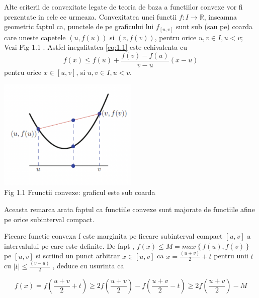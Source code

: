 \documentclass[a4paper,12pt,oneside]{report}
\begin{document}
Alte criterii de convexitate legate de teoria de baza a functiilor convexe vor fi prezentate in cele ce urmeaza. 
Convexitatea unei functii \(f : I\rightarrow \mathbb{R}\), inseamna geometric faptul ca, punctele de pe graficului lui  \(f_{\left [ u,v \right ]}\) sunt sub (sau pe) coarda care uneste capetele \(\left ( u , f {\left ( u \right )} \right )\)  si \(\left ( v , f {\left ( v \right )} \right )\), pentru orice \(u, v \in I, u < v\); 
Vezi Fig 1.1 . Astfel inegalitatea \ref{eq:1.1} este echivalenta cu 
\begin{displaymath}
  f\left ( x \right )\leq f\left ( u \right ) +\frac{f\left ( v \right )- f\left ( u \right )}{v - u}\left ( x - u \right ) \label{eq:1.2} \tag{1.2}
\end{displaymath}
pentru orice \(x\in \left [  u, v\right ]\), si \(u, v \in I, u < v\). 

\begin{center}
	\includegraphics[width=0.5\textwidth]{fig1.1.png}
	\\ Fig 1.1 Frunctii convexe: graficul este sub coarda
\end{center}

Aceasta remarca arata faptul ca functiile convexe sunt majorate de functiile afine pe orice subinterval compact. 

Fiecare functie convexa f este marginita pe fiecare subinterval compact \(\left [ u , v \right ]\) a intervalului pe care este definite. De fapt , \(f\left ( x \right ) \leq  M = max \left \{ f\left ( u \right ), f\left ( v \right ) \right \}\)  pe \(\left [ u , v \right ]\)  si scriind un punct arbitrar \(x\in  \left [ u , v  \right ]\)  ca  \(x= \frac{\left ( u + v \right )}{2} + t\) pentru unii \(t\) cu \(\left | t \right |\leq \frac{\left ( v - u \right )}{2}\) , deduce cu usurinta ca 

\begin{displaymath}
  f\left ( x \right )=  f\left ( \frac{u+v}{2} + t\right )\geq 2 f\left ( \frac{u + v}{2} \right )- f\left ( \frac{u + v}{2} - t\right )\geq 2f\left ( \frac{u+v}{2} \right ) - M
\end{displaymath}
\end{document}
